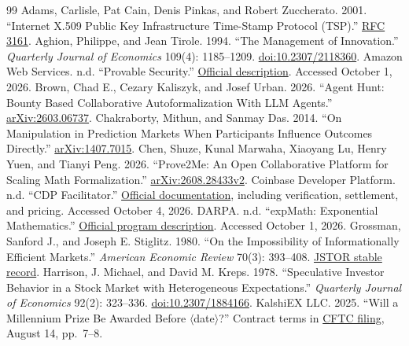 \documentclass[11pt,a4paper]{article}
\begin{document}
\clearpage
\begin{thebibliography}{99}
\small
{} Adams, Carlisle, Pat Cain, Denis Pinkas, and Robert Zuccherato. 2001. ``Internet X.509 Public Key Infrastructure Time-Stamp Protocol (TSP).'' \href{https://www.rfc-editor.org/rfc/rfc3161}{RFC 3161}.
 Aghion, Philippe, and Jean Tirole. 1994. ``The Management of Innovation.'' \emph{Quarterly Journal of Economics} 109(4): 1185--1209. \href{https://doi.org/10.2307/2118360}{doi:10.2307/2118360}.
 Amazon Web Services. n.d. ``Provable Security.'' \href{https://aws.amazon.com/security/provable-security/}{Official description}. Accessed October 1, 2026.
 Brown, Chad E., Cezary Kaliszyk, and Josef Urban. 2026. ``Agent Hunt: Bounty Based Collaborative Autoformalization With LLM Agents.'' \href{https://arxiv.org/abs/2603.06737}{arXiv:2603.06737}.
 Chakraborty, Mithun, and Sanmay Das. 2014. ``On Manipulation in Prediction Markets When Participants Influence Outcomes Directly.'' \href{https://arxiv.org/abs/1407.7015}{arXiv:1407.7015}.
 Chen, Shuze, Kunal Marwaha, Xiaoyang Lu, Henry Yuen, and Tianyi Peng. 2026. ``Prove2Me: An Open Collaborative Platform for Scaling Math Formalization.'' \href{https://arxiv.org/html/2608.28433v2}{arXiv:2608.28433v2}.
 Coinbase Developer Platform. n.d. ``CDP Facilitator.'' \href{https://docs.cdp.coinbase.com/x402/seller/facilitator}{Official documentation}, including verification, settlement, and pricing. Accessed October 4, 2026.
 DARPA. n.d. ``expMath: Exponential Mathematics.'' \href{https://www.darpa.mil/research/programs/expmath-exponential-mathematics}{Official program description}. Accessed October 1, 2026.
 Grossman, Sanford J., and Joseph E. Stiglitz. 1980. ``On the Impossibility of Informationally Efficient Markets.'' \emph{American Economic Review} 70(3): 393--408. \href{https://www.jstor.org/stable/1805228}{JSTOR stable record}.
 Harrison, J. Michael, and David M. Kreps. 1978. ``Speculative Investor Behavior in a Stock Market with Heterogeneous Expectations.'' \emph{Quarterly Journal of Economics} 92(2): 323--336. \href{https://doi.org/10.2307/1884166}{doi:10.2307/1884166}.
 KalshiEX LLC. 2025. ``Will a Millennium Prize Be Awarded Before $\langle$date$\rangle$?'' Contract terms in \href{https://www.cftc.gov/filings/ptc/ptc08142528943.pdf}{CFTC filing}, August 14, pp.~7--8.

\end{thebibliography}
\end{document}
